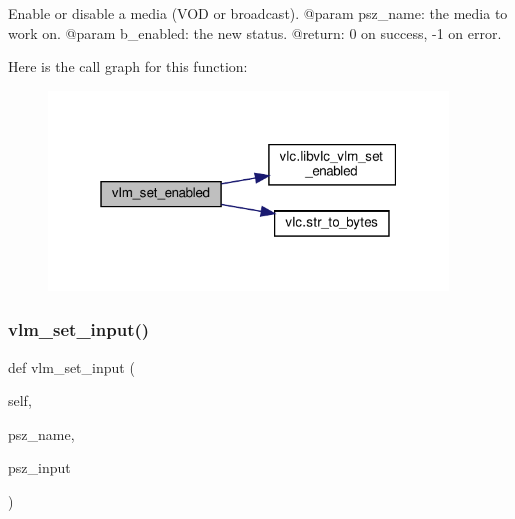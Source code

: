 \begin{DoxyVerb}Enable or disable a media (VOD or broadcast).
@param psz_name: the media to work on.
@param b_enabled: the new status.
@return: 0 on success, -1 on error.
\end{DoxyVerb}
 Here is the call graph for this function\+:
\nopagebreak
\begin{figure}[H]
\begin{center}
\leavevmode
\includegraphics[width=301pt]{classvlc_1_1_instance_a1096326419fe3760417950781576f535_cgraph}
\end{center}
\end{figure}
\mbox{\label{classvlc_1_1_instance_a45f0affea9ab90df05c660bccba514a5}} 
\subsubsection{\texorpdfstring{vlm\+\_\+set\+\_\+input()}{vlm\_set\_input()}}
{\footnotesize\ttfamily def vlm\+\_\+set\+\_\+input (\begin{DoxyParamCaption}\item[{}]{self,  }\item[{}]{psz\+\_\+name,  }\item[{}]{psz\+\_\+input }\end{DoxyParamCaption})}

